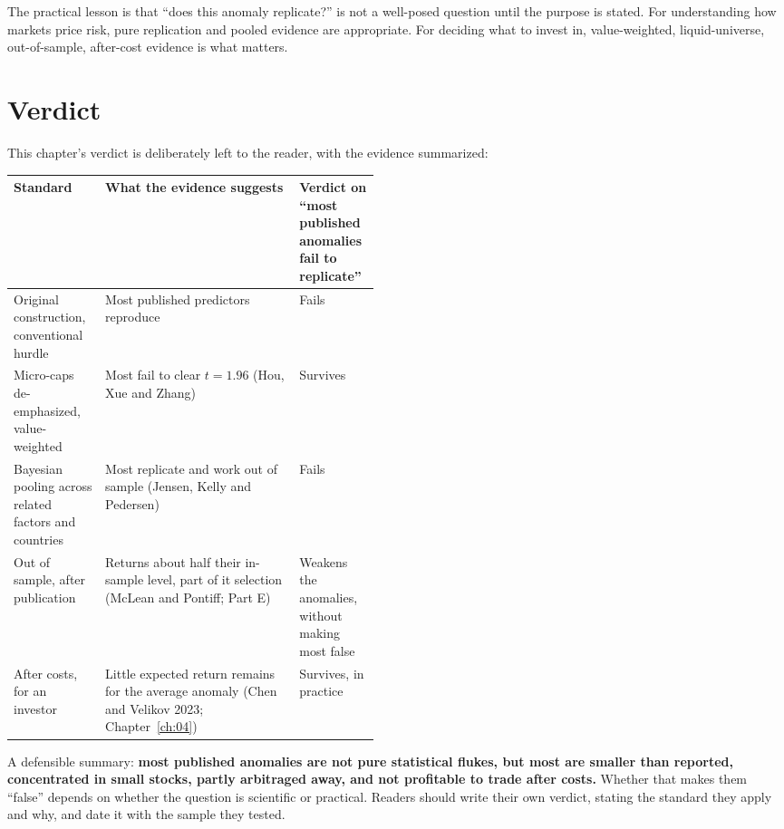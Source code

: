 The practical lesson is that ``does this anomaly replicate?'' is not a well-posed question until the purpose is stated. For understanding how markets price risk, pure replication and pooled evidence are appropriate. For deciding what to invest in, value-weighted, liquid-universe, out-of-sample, after-cost evidence is what matters.

\section{Verdict}
\label{sec:07-verdict}

This chapter's verdict is deliberately left to the reader, with the evidence summarized:

\begin{center}
\small
\begin{tabularx}{0.9\linewidth}{@{}>{\raggedright\arraybackslash}p{0.25\linewidth}>{\raggedright\arraybackslash}X>{\raggedright\arraybackslash}p{0.22\linewidth}@{}}
\toprule
Standard & What the evidence suggests & Verdict on ``most published anomalies fail to replicate'' \\
\midrule
Original construction, conventional hurdle & Most published predictors reproduce & Fails \\
Micro-caps de-emphasized, value-weighted & Most fail to clear $t = 1.96$ (Hou, Xue and Zhang) & Survives \\
Bayesian pooling across related factors and countries & Most replicate and work out of sample (Jensen, Kelly and Pedersen) & Fails \\
Out of sample, after publication & Returns about half their in-sample level, part of it selection (McLean and Pontiff; Part E) & Weakens the anomalies, without making most false \\
After costs, for an investor & Little expected return remains for the average anomaly (Chen and Velikov 2023; Chapter~\ref{ch:04}) & Survives, in practice \\
\bottomrule
\end{tabularx}
\end{center}

A defensible summary: \textbf{most published anomalies are not pure statistical flukes, but most are smaller than reported, concentrated in small stocks, partly arbitraged away, and not profitable to trade after costs.} Whether that makes them ``false'' depends on whether the question is scientific or practical. Readers should write their own verdict, stating the standard they apply and why, and date it with the sample they tested.

